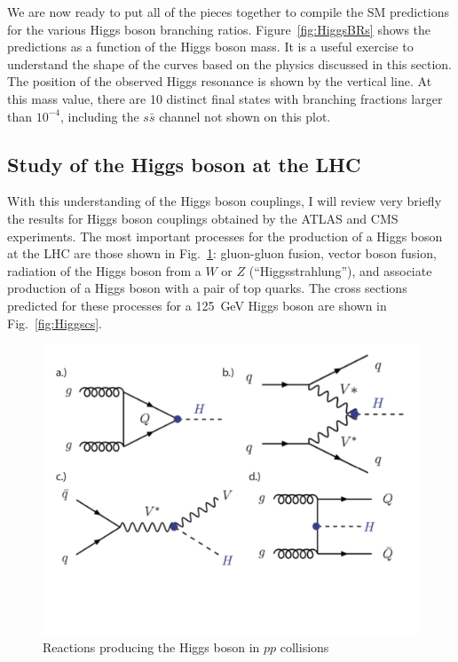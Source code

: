 \documentclass[12pt]{article}
\begin{document}
We are now ready to put all of the pieces together to compile the SM
predictions for the various Higgs boson branching ratios.
Figure~\ref{fig:HiggsBRs} shows the predictions as a function of the
Higgs boson mass.   It is a useful exercise to understand the shape of
the curves based on the physics discussed in this section.   The
position of the observed Higgs resonance is shown by the vertical
line.  At this mass value, there are 10  distinct final states with
branching fractions larger than $10^{-4}$, including the $s\bar s$
channel not shown on this plot.


 
\subsection{Study of the Higgs boson at the LHC}



With this understanding of the Higgs boson couplings, I will review
very briefly the results for Higgs boson couplings obtained by the
ATLAS and CMS
experiments.  The most important processes for the production of a
Higgs boson at the LHC are those shown in Fig.~\ref{fig:Hprocesses}: 
gluon-gluon fusion, vector boson fusion, radiation of the Higgs boson
from a $W$ or $Z$ (``Higgsstrahlung''), and associate production of a
Higgs boson with a pair of top quarks.   The cross sections predicted
for these processes for a 125~GeV Higgs boson are shown in
Fig.~\ref{fig:Higgscs}. 



\begin{figure}
\begin{center}
\includegraphics[width=0.70\hsize]{Higgsreactions.pdf}
\end{center}
\caption{Reactions producing the Higgs boson in $pp$ collisions}
\label{fig:Hprocesses}
\end{figure}
\end{document}
